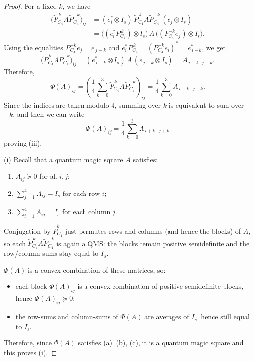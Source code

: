 \documentclass[11pt, a4paper]{article}
\theoremstyle{plain}
\theoremstyle{definition}
\theoremstyle{remark}
\begin{document}
\begin{proof}
For a fixed \(k\), we have
\begin{align*}
\bigl(\widetilde P_{C_4}^{\,k} A \widetilde P_{C_4}^{-k}\bigr)_{ij}
&= (e_i^*\otimes I_s)\, \widetilde P_{C_4}^{\,k} A \widetilde P_{C_4}^{-k}\, (e_j\otimes I_s) \\
&= \bigl((e_i^* P_{C_4}^{\,k})\otimes I_s\bigr)\, A \,
   \bigl((P_{C_4}^{-k} e_j)\otimes I_s\bigr).
\end{align*}
Using the equalities \(P_{C_4}^{-k}e_j=e_{\,j-k}\) and
\(e_i^* P_{C_4}^{\,k} = (P_{C_4}^{-k}e_i)^* = e_{\,i-k}^*\), we get
\[
\bigl(\widetilde P_{C_4}^{\,k} A \widetilde P_{C_4}^{-k}\bigr)_{ij}
= (e_{\,i-k}^* \otimes I_s)\, A\, (e_{\,j-k}\otimes I_s)
= A_{\,i-k,\; j-k}.
\]
Therefore,
\[
\Phi(A)_{ij}
= \left(\frac14 \sum_{k=0}^3 \widetilde P_{C_4}^{\,k} A \widetilde P_{C_4}^{-k}\right)_{ij}
= \frac14 \sum_{k=0}^3 A_{\,i-k,\; j-k}.
\]
Since the indices are taken modulo \(4\), summing over \(k\) is equivalent to sum over \(-k\), and then we can write
\[
\Phi(A)_{ij}
= \frac14 \sum_{k=0}^3 A_{\,i+k,\; j+k}
\]
proving (iii).

\smallskip

(i)
Recall that a quantum magic square \(A\) satisfies:
\begin{enumerate}
\item[(a)] \(A_{ij} \succeq 0\) for all \(i,j\);
\item[(b)] \(\sum_{j=1}^4 A_{ij} = I_s\) for each row \(i\);
\item[(c)] \(\sum_{i=1}^4 A_{ij} = I_s\) for each column \(j\).
\end{enumerate}
Conjugation by \(\widetilde P_{C_4}^k\) just permutes rows and columns (and hence the
blocks) of \(A\), so each \(\widetilde P_{C_4}^{\,k} A \widetilde P_{C_4}^{-k}\) is again a QMS:
the blocks remain positive semidefinite and the row/column sums stay equal to \(I_s\).

\(\Phi(A)\) is a convex combination of these matrices, so:
\begin{itemize}
\item each block \(\Phi(A)_{ij}\) is a convex combination of positive semidefinite blocks, hence \(\Phi(A)_{ij}\succeq 0\);
\item the row-sums and column-sums of \(\Phi(A)\) are averages of \(I_s\), hence still equal to \(I_s\).
\end{itemize}
Therefore, since \(\Phi(A)\) satisfies (a), (b), (c), it is a quantum magic square and this proves (i).
\end{proof}
\end{document}
